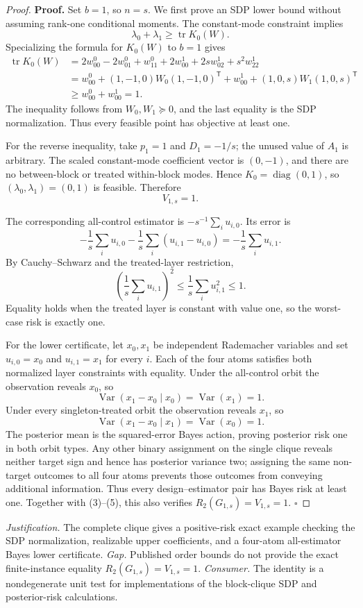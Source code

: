 \documentclass{article}
\begin{document}
\begin{proof}
\textbf{Proof.}
Set \(b=1\), so \(n=s\). We first prove an SDP lower bound without assuming rank-one conditional moments. The constant-mode constraint implies
\[
\lambda_0+\lambda_1\geq\operatorname{tr}K_0(W).
\tag{1}
\]
Specializing the formula for \(K_0(W)\) to \(b=1\) gives
\[
\begin{aligned}
\operatorname{tr}K_0(W)
&=2w^0_{00}-2w^0_{01}+w^0_{11}
  +2w^1_{00}+2sw^1_{02}+s^2w^1_{22}\\
&=w^0_{00}+(1,-1,0)W_0(1,-1,0)^{\mathsf T}
  +w^1_{00}+(1,0,s)W_1(1,0,s)^{\mathsf T}\\
&\geq w^0_{00}+w^1_{00}=1.
\end{aligned}
\tag{2}
\]
The inequality follows from \(W_0,W_1\succeq0\), and the last equality is the SDP normalization. Thus every feasible point has objective at least one.

For the reverse inequality, take \(p_1=1\) and \(D_1=-1/s\); the unused value of \(A_1\) is arbitrary. The scaled constant-mode coefficient vector is \((0,-1)\), and there are no between-block or treated within-block modes. Hence \(K_0=\operatorname{diag}(0,1)\), so \((\lambda_0,\lambda_1)=(0,1)\) is feasible. Therefore
\[
V_{1,s}=1.
\tag{3}
\]

The corresponding all-control estimator is \(-s^{-1}\sum_i u_{i,0}\). Its error is
\[
-\frac1s\sum_i u_{i,0}
-\frac1s\sum_i(u_{i,1}-u_{i,0})
=-\frac1s\sum_i u_{i,1}.
\tag{4}
\]
By Cauchy--Schwarz and the treated-layer restriction,
\[
\left(\frac1s\sum_i u_{i,1}\right)^2
\leq\frac1s\sum_i u_{i,1}^2\leq1.
\tag{5}
\]
Equality holds when the treated layer is constant with value one, so the worst-case risk is exactly one.

For the lower certificate, let \(x_0,x_1\) be independent Rademacher variables and set \(u_{i,0}=x_0\) and \(u_{i,1}=x_1\) for every \(i\). Each of the four atoms satisfies both normalized layer constraints with equality. Under the all-control orbit the observation reveals \(x_0\), so
\[
\operatorname{Var}(x_1-x_0\mid x_0)=\operatorname{Var}(x_1)=1.
\tag{6}
\]
Under every singleton-treated orbit the observation reveals \(x_1\), so
\[
\operatorname{Var}(x_1-x_0\mid x_1)=\operatorname{Var}(x_0)=1.
\tag{7}
\]
The posterior mean is the squared-error Bayes action, proving posterior risk one in both orbit types. Any other binary assignment on the single clique reveals neither target sign and hence has posterior variance two; assigning the same non-target outcomes to all four atoms prevents those outcomes from conveying additional information. Thus every design--estimator pair has Bayes risk at least one. Together with (3)--(5), this also verifies \(R_2(G_{1,s})=V_{1,s}=1\). \(\square\)
\end{proof}
\par\smallskip\noindent \textit{Justification.} The complete clique gives a positive-risk exact example checking the SDP normalization, realizable upper coefficients, and a four-atom all-estimator Bayes lower certificate. \textit{Gap.} Published order bounds do not provide the exact finite-instance equality \(R_2(G_{1,s})=V_{1,s}=1\). \textit{Consumer.} The identity is a nondegenerate unit test for implementations of the block-clique SDP and posterior-risk calculations.
\end{document}
